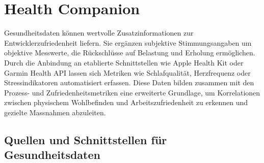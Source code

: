 \documentclass[12pt,a4paper]{report}
\begin{document}

%


\section{Health Companion}

Gesundheitsdaten können wertvolle Zusatzinformationen zur Entwicklerzufriedenheit liefern. Sie ergänzen subjektive Stimmungsangaben
um objektive Messwerte, die Rückschlüsse auf Belastung und Erholung ermöglichen. Durch die Anbindung an etablierte Schnittstellen
wie Apple Health Kit oder Garmin Health API lassen sich Metriken wie Schlafqualität, Herzfrequenz oder Stressindikatoren
automatisiert erfassen. Diese Daten bilden zusammen mit den Prozess- und Zufriedenheitsmetriken eine erweiterte Grundlage, um
Korrelationen zwischen physischem Wohlbefinden und Arbeitszufriedenheit zu erkennen und gezielte Massnahmen abzuleiten.

\subsection{Quellen und Schnittstellen für Gesundheitsdaten}
\end{document}
